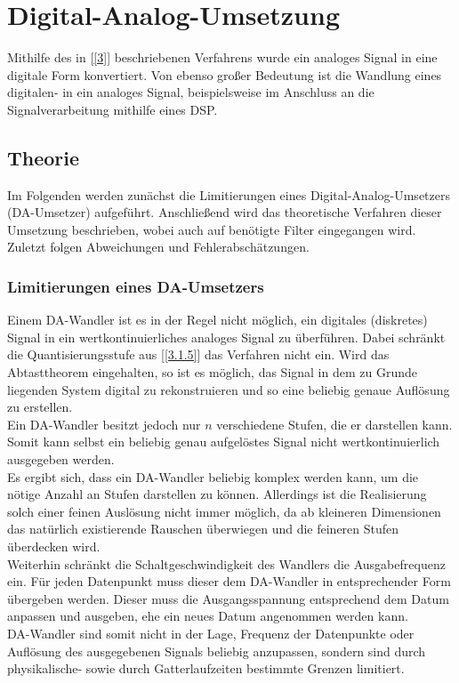 \section{Digital-Analog-Umsetzung}\label{4}

Mithilfe des in [\ref{3}] beschriebenen Verfahrens wurde ein analoges Signal in eine digitale Form konvertiert. Von ebenso großer Bedeutung ist die Wandlung eines digitalen- in ein analoges Signal, beispielsweise im Anschluss an die Signalverarbeitung mithilfe eines DSP.

\subsection{Theorie}
Im Folgenden werden zunächst die Limitierungen eines Digital-Analog-Umsetzers (DA-Umsetzer) aufgeführt. Anschließend wird das theoretische Verfahren dieser Umsetzung beschrieben, wobei auch auf benötigte Filter eingegangen wird. Zuletzt folgen Abweichungen und Fehlerabschätzungen.

\subsubsection{Limitierungen eines DA-Umsetzers}
Einem DA-Wandler ist es in der Regel nicht möglich, ein digitales (diskretes) Signal in ein wertkontinuierliches analoges Signal zu überführen. Dabei schränkt die Quantisierungsstufe aus [\ref{3.1.5}] das Verfahren nicht ein. Wird das Abtasttheorem eingehalten, so ist es möglich, das Signal in dem zu Grunde liegenden System digital zu rekonstruieren und so eine beliebig genaue Auflösung zu erstellen.\\
Ein DA-Wandler besitzt jedoch nur $n$ verschiedene Stufen, die er darstellen kann. Somit kann selbst ein beliebig genau aufgelöstes Signal nicht wertkontinuierlich ausgegeben werden.\\
Es ergibt sich, dass ein DA-Wandler beliebig komplex werden kann, um die nötige Anzahl an Stufen darstellen zu können. Allerdings ist die Realisierung solch einer feinen Auslösung nicht immer möglich, da ab kleineren Dimensionen das natürlich existierende Rauschen überwiegen und die feineren Stufen überdecken wird.\\
Weiterhin schränkt die Schaltgeschwindigkeit des Wandlers die Ausgabefrequenz ein. Für jeden Datenpunkt muss dieser dem DA-Wandler in entsprechender Form übergeben werden. Dieser muss die Ausgangsspannung entsprechend dem Datum anpassen und ausgeben, ehe ein neues Datum angenommen werden kann.\\
DA-Wandler sind somit nicht in der Lage, Frequenz der Datenpunkte oder Auflösung des ausgegebenen Signals beliebig anzupassen, sondern sind durch physikalische- sowie durch Gatterlaufzeiten bestimmte Grenzen limitiert.

